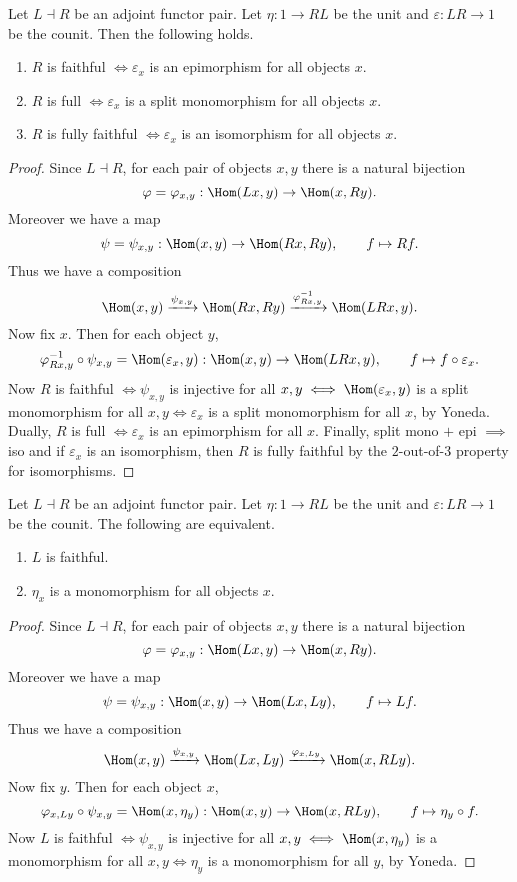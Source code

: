 \begin{proposition}
Let $L \dashv R$ be an adjoint functor pair. Let $\eta : 1 \to RL$ be the unit and $\varepsilon : LR \to 1$ be the counit. Then the following holds.
\begin{enumerate}
  \item $R$ is faithful $\iff \varepsilon_x$ is an epimorphism for all objects $x$.
  \item $R$ is full $\iff \varepsilon_x$ is a split monomorphism for all objects $x$.
  \item $R$ is fully faithful $\iff \varepsilon_x$ is an isomorphism for all objects $x$.
\end{enumerate}
\end{proposition}
\begin{proof}
Since $L \dashv R$, for each pair of objects $x,y$ there is a natural bijection
\[ \varphi = \varphi_{x,y} : \Hom(Lx,y) \to \Hom(x,Ry). \]
Moreover we have a map
\[ \psi = \psi_{x,y} : \Hom(x,y) \to \Hom(Rx,Ry), \qquad f \mapsto Rf. \]
Thus we have a composition
\[ \Hom(x,y) \xrightarrow{\psi_{x,y}} \Hom(Rx,Ry) \xrightarrow{\varphi_{Rx,y}^{-1}} \Hom(LRx,y). \]
Now fix $x$. Then for each object $y$,
\[ \varphi^{-1}_{Rx,y} \circ \psi_{x,y} = \Hom(\varepsilon_x,y) : \Hom(x,y) \to \Hom(LRx,y), \qquad f \mapsto f \circ \varepsilon_x. \]
Now $R$ is faithful $\iff \psi_{x,y}$ is injective for all $x,y \iff \Hom(\varepsilon_x,y)$ is a split monomorphism for all $x,y \iff \varepsilon_x$ is a split monomorphism for all $x$, by Yoneda. Dually, $R$ is full $\iff \varepsilon_x$ is an epimorphism for all $x$. Finally, split mono $+$ epi $\implies$ iso and if $\varepsilon_x$ is an isomorphism, then $R$ is fully faithful by the $2$-out-of-$3$ property for isomorphisms.
\end{proof}

\begin{proposition}
Let $L \dashv R$ be an adjoint functor pair. Let $\eta : 1 \to RL$ be the unit and $\varepsilon : LR \to 1$ be the counit. The following are equivalent.
\begin{enumerate}
  \item $L$ is faithful.
  \item $\eta_x$ is a monomorphism for all objects $x$.
\end{enumerate}
\end{proposition}
\begin{proof}
Since $L \dashv R$, for each pair of objects $x,y$ there is a natural bijection
\[ \varphi = \varphi_{x,y} : \Hom(Lx,y) \to \Hom(x,Ry). \]
Moreover we have a map
\[ \psi = \psi_{x,y} : \Hom(x,y) \to \Hom(Lx,Ly), \qquad f \mapsto Lf. \]
Thus we have a composition
\[ \Hom(x,y) \xrightarrow{\psi_{x,y}} \Hom(Lx,Ly) \xrightarrow{\varphi_{x,Ly}} \Hom(x,RLy). \]
Now fix $y$. Then for each object $x$,
\[ \varphi_{x,Ly} \circ \psi_{x,y} = \Hom(x, \eta_y) : \Hom(x,y) \to \Hom(x, RLy), \qquad f \mapsto \eta_y \circ f. \]
Now $L$ is faithful $\iff \psi_{x,y}$ is injective for all $x,y \iff \Hom(x,\eta_y)$ is a monomorphism for all $x,y \iff \eta_y$ is a monomorphism for all $y$, by Yoneda.
\end{proof}

